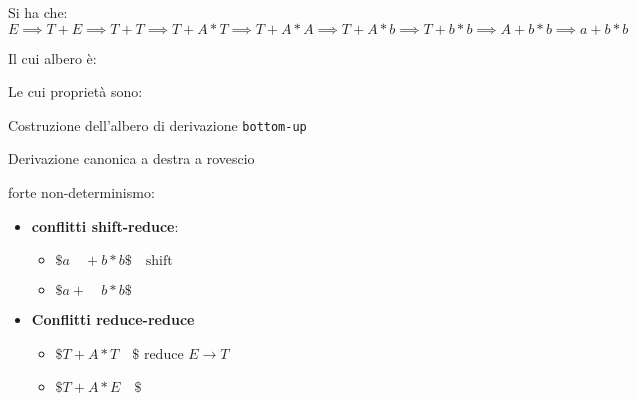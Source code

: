 {    Si ha che:
    \[
        E\implies T+E\implies T+T \implies T + A* T \implies T+A*A \implies T + A * b \implies T + b * b \implies A + b*b  \implies a + b*b
    \]

    Il cui albero è:
    \begin{center}
    \end{center}
    
    Le cui proprietà sono:
    \begin{center}
        \item Costruzione dell'albero di derivazione \texttt{bottom-up}    
        \item Derivazione canonica a destra a rovescio
        \item forte non-determinismo:
        \begin{itemize}
            \item \textbf{conflitti shift-reduce}:
            \begin{itemize}
                \item $\$a \quad +b*b\$ \quad \text{shift}$
                \item $\$ a+ \quad b*b \$$
            \end{itemize}
            \item \textbf{Conflitti reduce-reduce}
            \begin{itemize}
                \item $\$T+A*T\quad\$$ reduce $E\to T$
                \item $\$T+A*E\quad\$$
            \end{itemize}
        \end{itemize}
    \end{center}
}

